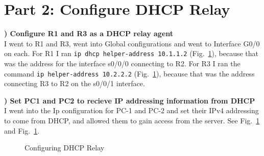 \documentclass{report}
\newcommand{\mysection}[1]{\section*{#1}}
\newcommand{\mysubsection}[2]{\textbf{\romannumeral #1) #2}}
\begin{document}
\mysection{\textbf{Part 2: Configure DHCP Relay}}

\mysubsection{1}{Configure R1 and R3 as a DHCP relay agent}\\
I went to R1 and R3, went into Global configurations and went to Interface G0/0
on each. For R1 I ran
{\scriptsize{\verb$ip dhcp helper-address 10.1.1.2$}\normalsize}
(Fig.~\ref{P2Config19}), because that was the address for
the interface s0/0/0 connecting to R2. For R3 I ran the command
{\scriptsize{\verb$ip helper-address 10.2.2.2$}\normalsize}
(Fig.~\ref{P2Config19}), because that was the address
connecting R3 to R2 on the s0/0/1 interface.

\noindent\mysubsection{2}{Set PC1 and PC2 to recieve IP addressing information
from DHCP}\\
I went into the Ip configuration for PC-1 and PC-2 and set their IPv4
addressing to come from DHCP, and allowed them to gain access from the server.
See Fig.~\ref{P2Config19} and
Fig.~\ref{P2Config19}.


\begin{figure}[!hbt]\centering
{}\hfill
{}\par
{}\hfill
{}\par
\caption{Configuring DHCP Relay}\label{P2Config19}
\end{figure}
\end{document}
